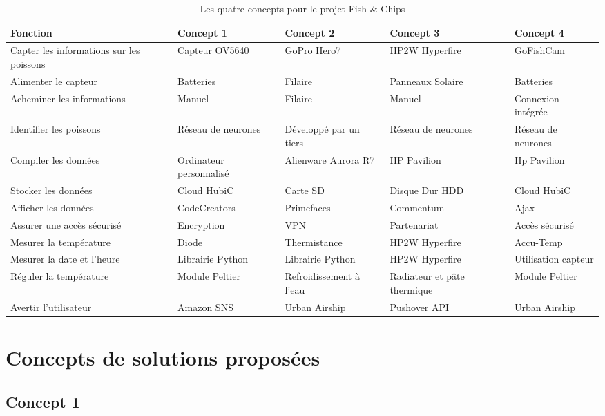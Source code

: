 \begin{table}[h]
    \centering
    \begin{tabular}{|p{3cm}|p{3cm}|p{2.5cm}|p{2.5cm}|p{2.5cm}|}
    \hline
    \textbf{Fonction} & \textbf{Concept 1} & \textbf{Concept 2} & \textbf{Concept 3} & \textbf{Concept 4}\\ \hline
    Capter les informations sur les poissons & Capteur OV5640 & GoPro Hero7 & HP2W Hyperfire & GoFishCam \\ \hline
    Alimenter le capteur & Batteries & Filaire & Panneaux Solaire & Batteries \\ \hline
    Acheminer les informations & Manuel & Filaire & Manuel & Connexion intégrée \\ \hline
    Identifier les poissons & Réseau de neurones & Développé par un tiers & Réseau de neurones & Réseau de neurones \\ \hline
    Compiler les données & Ordinateur personnalisé & Alienware Aurora R7 & HP Pavilion & Hp Pavilion\\ \hline
    Stocker les données & Cloud HubiC & Carte SD & Disque Dur HDD & Cloud HubiC\\ \hline
    Afficher les données & CodeCreators & Primefaces & Commentum & Ajax\\ \hline
    Assurer une accès sécurisé & Encryption & VPN & Partenariat & Accès sécurisé\\ \hline
    Mesurer la température & Diode & Thermistance & HP2W Hyperfire & Accu-Temp\\ \hline
    Mesurer la date et l'heure & Librairie Python & Librairie Python & HP2W Hyperfire & Utilisation capteur \\ \hline
    Réguler la température & Module Peltier & Refroidissement à l'eau & Radiateur et pâte thermique & Module Peltier\\ \hline
    Avertir l'utilisateur & Amazon SNS & Urban Airship  & Pushover API & Urban Airship\\
    \hline
    \end{tabular}
    \caption{Les quatre concepts pour le projet Fish \& Chips}
    \label{tab:4_concepts}
\end{table}

\section{Concepts de solutions proposées}

\subsection{Concept 1}

